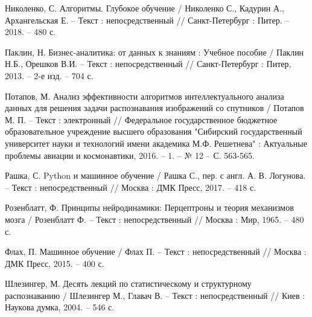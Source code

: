 \begin{thebibliography}{3}
	 Николенко, С. Алгоритмы. Глубокое обучение / Николенко С., Кадурин А., Архангельская Е. -- Текст : непосредственный // Санкт-Петербург : Питер. -- 2018. -- 480 с.
	
	 Паклин, Н. Бизнес-аналитика: от данных к знаниям : Учебное пособие / Паклин Н.Б., Орешков В.И. -- Текст : непосредственный // Санкт-Петербург : Питер, 2013. -- 2-е изд. -- 704 с.
	
	 Потапов, М. Анализ эффективности алгоритмов интеллектуального анализа данных для решения задачи распознавания изображений со спутников / Потапов М. П. -- Текст : электронный // Федеральное государственное бюджетное образовательное учреждение высшего образования "Сибирский государственный университет науки и технологий имени академика М.Ф. Решетнева" : Актуальные проблемы авиации и космонавтики, 2016. -- 1. -- № 12 -- С. 563-565.	
	
	 Рашка, С. Python и машинное обучение / Рашка С., пер. с англ. А. В. Логунова. -- Текст : непосредственный // Москва : ДМК Пресс, 2017. -- 418 с.		
	
	 Розенблатт, Ф. Принципы нейродинамики: Перцептроны и теория механизмов мозга / Розенблатт Ф. -- Текст : непосредственный // Москва : Мир, 1965. -- 480 с.	
	
	 Флах, П. Машинное обучение / Флах П. -- Текст : непосредственный // Москва : ДМК Пресс, 2015. -- 400 с.
	
	 Шлезингер, М. Десять лекций по статистическому и структурному распознаванию / Шлезингер М., Главач В. -- Текст : непосредственный // Киев : Наукова думка, 2004. -- 546 с.
	
\end{thebibliography}